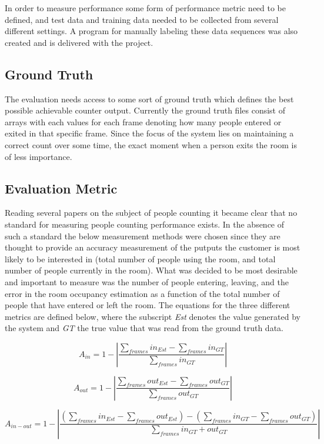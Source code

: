 In order to measure performance some form of performance metric need to be defined, and test data and training data needed to be collected from several different settings. A program for manually labeling these data sequences was also created and is delivered with the project.

\subsection{Ground Truth}
The evaluation needs access to some sort of ground truth which defines the best possible achievable counter output. Currently the ground truth files consist of arrays with each values for each frame denoting how many people entered or exited in that specific frame. Since the focus of the system lies on maintaining a correct count over some time, the exact moment when a person exits the room is of less importance.

\subsection{Evaluation Metric}
Reading several papers on the subject of people counting it became clear that no standard for measuring people counting performance exists. In the absence of such a standard the below measurement methods were chosen since they are thought to provide an accuracy measurement of the putputs the customer is most likely to be interested in (total number of people using the room, and total number of people currently in the room).
What was decided to be most desirable and important to measure was the number of people entering, leaving, and the error in the room occupancy estimation as a function of the total number of people that have entered or left the room. The equations for the three different metrics are defined below, where the subscript \textit{Est} denotes the value generated by the system and \textit{GT} the true value that was read from the ground truth data.

\begin{equation}
\label{eq:in_accuracy}
A_{in} = 1 - |\frac{\sum_{frames}{in_{Est}}-\sum_{frames}{in_{GT}}}{\sum_{frames}in_{GT}}|
\end{equation} 

\begin{equation}
\label{eq:out_accuracy}
A_{out} = 1 - |\frac{\sum_{frames}{out_{Est}}-\sum_{frames}out_{GT}}{\sum_{frames}out_{GT}}| 
\end{equation} 

\begin{equation}
\label{eq:occupacy_accuracy}
A_{in-out} = 1 - |\frac{(\sum_{frames}{in_{Est}-\sum_{frames}out_{Est}})-(\sum_{frames}{in_{GT}-\sum_{frames}out_{GT}})}{\sum_{frames}in_{GT}+out_{GT}}| 
\end{equation} 




